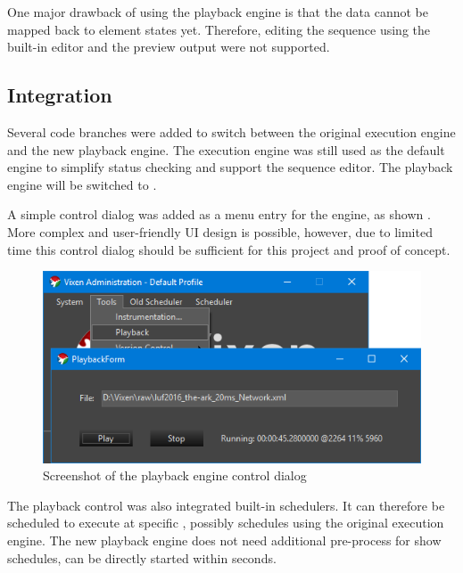 One major drawback of using the playback engine is that the  data cannot be mapped back to element states yet. Therefore, editing the  sequence using the built-in editor and the preview output were not supported.

\subsection{Integration}

Several code branches were added to switch between the original execution engine and the new playback engine. The execution engine was still used as the default engine to simplify status checking and support the sequence editor. The playback engine will be switched to .

A simple control dialog was added as a menu entry for the  engine, as shown  . More complex and user-friendly UI design is possible, however, due to limited time  this control dialog should be sufficient for this project and proof of concept.

\begin{figure}[t]
  \centering
  \includegraphics[width=0.8\columnwidth]{Figs/vixen_playback.png}
  \caption{\footnotesize Screenshot of the playback engine control dialog}
  \label{fig:vixen_playback}
\end{figure}

The playback control was also integrated  built-in schedulers. It can therefore be scheduled to execute at specific , possibly  schedules using the original execution engine. The new playback engine does not need additional pre-process for show schedules,  can be directly started within seconds.

